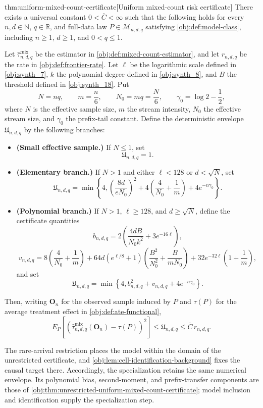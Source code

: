 \documentclass[11pt]{article}
\begin{document}
\begin{theoremv}{thm:uniform-mixed-count-certificate}[Uniform mixed-count risk certificate]
There exists a universal constant \(0<\overline C<\infty\) such that the following holds for every \(n,d\in\mathbb N\), \(q\in\mathbb R\), and full-data law \(P\in\mathcal M_{n,d,q}\) satisfying \cref{obj:def:model-class}, including \(n\ge1\), \(d\ge1\), and \(0<q\le1\).

Let \(\widehat\tau^{\mathrm{mix}}_{n,d,q}\) be the estimator in \cref{obj:def:mixed-count-estimator}, and let \(r_{n,d,q}\) be the rate in \cref{obj:def:frontier-rate}. Let \(\ell\) be the logarithmic scale defined in \cref{obj:synth_7}, \(k\) the polynomial degree defined in \cref{obj:synth_8}, and \(B\) the threshold defined in \cref{obj:synth_18}. Put
\[
N=nq,\qquad m=\frac n6,\qquad N_0=mq=\frac N6,\qquad
\gamma_0=\log 2-\frac12,
\]
where \(N\) is the effective sample size, \(m\) the stream intensity, \(N_0\) the effective stream size, and \(\gamma_0\) the prefix-tail constant. Define the deterministic envelope \(\mathfrak U_{n,d,q}\) by the following branches:
\begin{itemize}
\item \textbf{(Small effective sample.)} If \(N\le1\), set
\[
\mathfrak U_{n,d,q}=1.
\]
\item \textbf{(Elementary branch.)} If \(N>1\) and either \(\ell<128\) or \(d<\sqrt N\), set
\[
\mathfrak U_{n,d,q}
=\min\left\{4,
\left(\frac{8d}{eN_0}\right)^2
+4\left(\frac4{N_0}+\frac1m\right)
+4e^{-n\gamma_0}\right\}.
\]
\item \textbf{(Polynomial branch.)} If \(N>1\), \(\ell\ge128\), and \(d\ge\sqrt N\), define the certificate quantities
\[
b_{n,d,q}
=2\left(\frac{4dB}{N_0k^2}+3e^{-16\ell}\right),
\]
\[
v_{n,d,q}
=8\left(\frac4{N_0}+\frac1m\right)
+64d\left(e^{\ell/8}+1\right)
\left(\frac{B^2}{N_0^2}+\frac{B}{mN_0}\right)
+32e^{-32\ell}\left(1+\frac1m\right),
\]
and set
\[
\mathfrak U_{n,d,q}
=\min\left\{4,b_{n,d,q}^2+v_{n,d,q}+4e^{-n\gamma_0}\right\}.
\]
\end{itemize}
Then, writing \(\mathbf O_n\) for the observed sample induced by \(P\) and \(\tau(P)\) for the average treatment effect in \cref{obj:def:ate-functional},
\[
E_P\!\left[
\left(\widehat\tau^{\mathrm{mix}}_{n,d,q}(\mathbf O_n)-\tau(P)\right)^2
\right]
\le \mathfrak U_{n,d,q}
\le \overline C\,r_{n,d,q}.
\]
\end{theoremv}

The rare-arrival restriction places the model within the domain of the unrestricted certificate, and \cref{obj:lem:cell-identification-background} fixes the causal target there. Accordingly, the specialization retains the same numerical envelope. Its polynomial bias, second-moment, and prefix-transfer components are those of \cref{obj:thm:unrestricted-uniform-mixed-count-certificate}; model inclusion and identification supply the specialization step.
\end{document}
